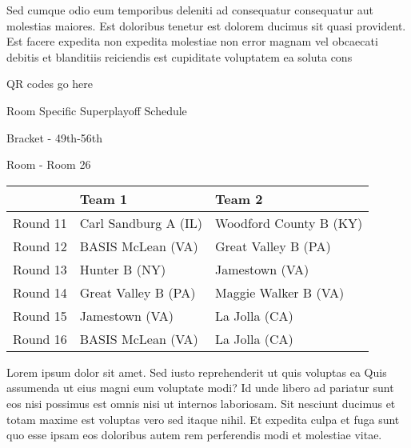 \documentclass{article}%
\begin{document}
\newline%
    Sed cumque odio eum temporibus deleniti ad consequatur consequatur aut molestias maiores. Est doloribus tenetur est dolorem ducimus sit quasi provident. Est facere expedita non expedita molestiae non error magnam vel obcaecati debitis et blanditiis reiciendis est cupiditate voluptatem ea soluta cons%
\vspace*{140pt}%
\begin{center}%
\begin{Huge}%
QR codes go here%
\end{Huge}%
\end{center}%
\newpage%
\begin{center}%
\begin{Huge}%
Room Specific Superplayoff Schedule%
\end{Huge}%
\vspace*{8pt}%
\linebreak%
\begin{Large}%
Bracket {-} 49th{-}56th%
\end{Large}%
\vspace*{8pt}%
\linebreak%
\vspace*{8pt}%
\begin{Large}%
Room {-} Room 26%
\end{Large}%
\end{center}%
%
\begin{tabularx}{\textwidth}{|c|Y|Y|}%
\hline%
&Team 1&Team 2\\%
\hline%
Round 11&Carl Sandburg A (IL)&Woodford County B (KY)\\%
Round 12&BASIS McLean (VA)&Great Valley B (PA)\\%
Round 13&Hunter B (NY)&Jamestown (VA)\\%
Round 14&Great Valley B (PA)&Maggie Walker B (VA)\\%
Round 15&Jamestown (VA)&La Jolla (CA)\\%
Round 16&BASIS McLean (VA)&La Jolla (CA)\\%
\hline%
\end{tabularx}%
\vspace*{8pt}%
\newline%
    Lorem ipsum dolor sit amet. Sed iusto reprehenderit ut quis voluptas ea Quis assumenda ut eius magni eum voluptate modi? Id unde libero ad pariatur sunt eos nisi possimus est omnis nisi ut internos laboriosam. Sit nesciunt ducimus et totam maxime est voluptas vero sed itaque nihil. Et expedita culpa et fuga sunt quo esse ipsam eos doloribus autem rem perferendis modi et molestiae vitae.\newline%
\end{document}

